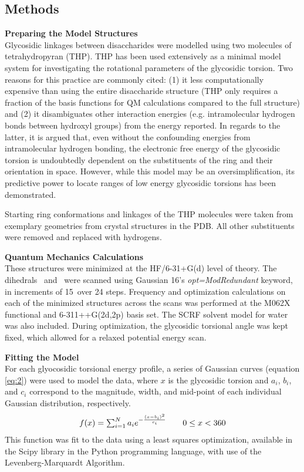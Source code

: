 \documentclass[a4paper, 12pt, openany]{book}
\begin{document}
\subsection{Methods}
\noindent \textbf{Preparing the Model Structures}\\
Glycosidic linkages between disaccharides were modelled using two molecules of tetrahydropyran (THP). THP has been used extensively as a minimal model system for investigating the rotational parameters of the glycosidic torsion. Two reasons for this practice are commonly cited: (1) it less computationally expensive than using the entire disaccharide structure (THP only requires a fraction of the basis functions for QM calculations compared to the full structure) and (2) it disambiguates other interaction energies (e.g. intramolecular hydrogen bonds between hydroxyl groups) from the energy reported. In regards to the latter, it is argued that, even without the confounding energies from intramolecular hydrogen bonding, the electronic free energy of the glycosidic torsion is undoubtedly dependent on the substituents of the ring and their orientation in space. However, while this model may be an  oversimplification, its predictive power to locate ranges of low energy glycosidic torsions has been demonstrated.\autocite{Nivedha2015}  

Starting ring conformations and linkages of the THP molecules were taken from exemplary geometries from crystal structures in the PDB. All other substituents were removed and replaced with hydrogens. 

\noindent \textbf{Quantum Mechanics Calculations}\\
These structures were minimized at the HF/6-31+G(d) level of theory. The dihedrals \textphi~and \textpsi~were scanned using Gaussian 16's \textit{opt=ModRedundant} keyword, in increments of 15\degree~over 24 steps. Frequency and optimization calculations on each of the minimized structures across the scans was performed at the M062X functional and 6-311++G(2d,2p) basis set. The SCRF solvent model for water was also included. During optimization, the glycosidic torsional angle was kept fixed, which allowed for a relaxed potential energy scan. 

\noindent \textbf{Fitting the Model}\\
For each glyocosidic torsional energy profile, a series of Gaussian curves (equation \ref{eq:2}) were used to model the data,  where $x$ is the glycosidic torsion and $a_{i}$, $b_{i}$, and $c_{i}$ correspond to the magnitude, width, and mid-point of each individual Gaussian distribution, respectively.
\begin{equation} \label{eq:2}
\begin{multlined}
$$f(x)=\sum^{N}_{i=1}a_{i}e^{-\frac{(x-b_{i})^{2}}{c_{i}}} \quad \quad 0 \leq x < 360$$
\end{multlined}
\end{equation}
\noindent This function was fit to the data using a least squares optimization, available in the Scipy library in the Python programming language, with use of the Levenberg-Marquardt Algorithm. 
\end{document}
